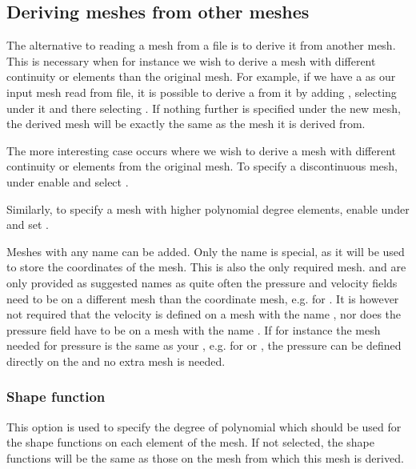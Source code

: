 \subsection{Deriving meshes from other meshes}
The alternative to reading a mesh from a file is to derive it from another
mesh. This is necessary when for instance we wish to derive a mesh with
different continuity or elements than the original mesh. 
For example, if we have a  as our input mesh read 
from file, it is possible to derive a  from it
by adding , selecting 
 under it and there selecting
. If nothing further is specified 
under the new mesh, the derived mesh will be exactly the same as the mesh
it is derived from.

The more interesting case occurs where we wish to derive a mesh with
different continuity or elements from the original mesh. To specify a
discontinuous mesh, under  enable
 and select .

Similarly, to specify a mesh with higher polynomial degree elements, enable
 under  and set
.

Meshes with any name can be added. Only the name  
is special, as it will be used to store the coordinates of the mesh. This 
is also the only required mesh.  and 
are only provided as suggested names as quite often the pressure 
and velocity fields need to be on a different mesh 
than the coordinate mesh, e.g. for \PoDGPt. It is however 
not required that the velocity is defined on a mesh with the name
, nor does the pressure field have to be on a mesh
with the name . If for instance the mesh needed 
for pressure is the same as your , e.g. 
for \Poo or \Pzero\Pone, the pressure can be defined directly on
the  and no extra mesh is needed.

\subsubsection{Shape function}

This option is used to specify the degree of polynomial which should be used
for the shape functions on each element of the mesh. If not selected, the
shape functions will be the same as those on the mesh from which this mesh
is derived.

